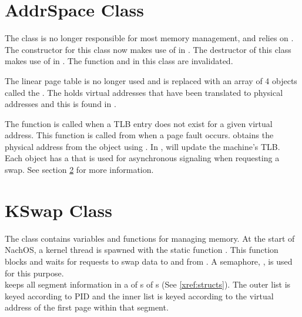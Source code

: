   \section{AddrSpace Class}
    The class  is no longer responsible for most memory
    management, and relies on .  The constructor for this class now
    makes use of  in .  The destructor of
    this class makes use of  in .  The 
    function  and  in this 
    class are invalidated.

    The linear page table is no longer used and is replaced with
    an array of 4  objects called the . The
     holds virtual addresses that have been translated to physical
    addresses and this is found in .
    
    The function  is called when a TLB entry does
    not exist for a given virtual address. This function is called from
     when a page fault occurs. 
    obtains the physical address from the  object using
    .  In ,  will 
    update the machine's TLB.\\

    Each  object has a  that is used for
    asynchronous signaling when requesting a swap. See section \ref{xref:kswap}
    for more information.

  \section{KSwap Class}
  \label{xref:kswap}
    The  class contains variables and functions for managing 
    memory.  At the start of NachOS, a kernel thread is spawned with
    the static function .  This
    function blocks and waits for requests to swap data to and from 
    . A semaphore, , is used for 
    this purpose.\\

     keeps all segment information in a  of
    s of  s 
    (See \ref{xref:structs}).  The outer list is keyed according to PID
    and the inner list is keyed according to the virtual address of the
    first page within that segment.\\

